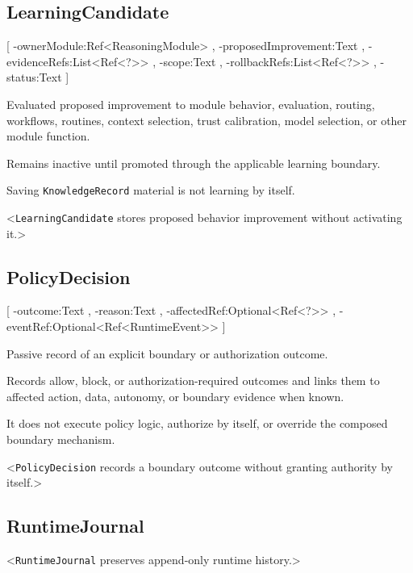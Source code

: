 \subsection{LearningCandidate}
[
	\UMLAt-ownerModule:Ref<ReasoningModule> ,
	\UMLAt-proposedImprovement:Text ,
	\UMLAt-evidenceRefs:List<Ref<?>> ,
	\UMLAt-scope:Text ,
	\UMLAt-rollbackRefs:List<Ref<?>> ,
	\UMLAt-status:Text
]{%
	\item[] Evaluated proposed improvement to module behavior, evaluation, routing, workflows, routines, context selection, trust calibration, model selection, or other module function.
	\item[] Remains inactive until promoted through the applicable learning boundary.
	\item[] Saving \texttt{KnowledgeRecord} material is not learning by itself.
}<\texttt{LearningCandidate} stores proposed behavior improvement without activating it.>

\subsection{PolicyDecision}
[
	\UMLAt-outcome:Text ,
	\UMLAt-reason:Text ,
	\UMLAt-affectedRef:Optional<Ref<?>> ,
	\UMLAt-eventRef:Optional<Ref<RuntimeEvent>>
]{%
	\item[] Passive record of an explicit boundary or authorization outcome.
	\item[] Records allow, block, or authorization-required outcomes and links them to affected action, data, autonomy, or boundary evidence when known.
	\item[] It does not execute policy logic, authorize by itself, or override the composed boundary mechanism.
}<\texttt{PolicyDecision} records a boundary outcome without granting authority by itself.>

\subsection{RuntimeJournal}
<\texttt{RuntimeJournal} preserves append-only runtime history.>

